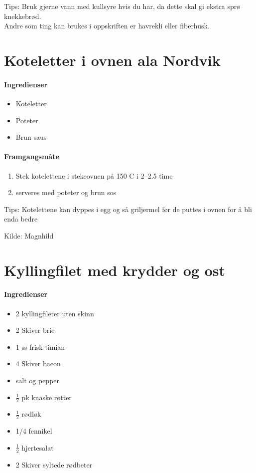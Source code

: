 \documentclass[12pt,a4paper]{book}
\begin{document}
Tips: Bruk gjerne vann med kullsyre hvis du har, da dette skal gi ekstra sprø knekkebrød. \\ Andre som ting kan brukes i oppskriften er havrekli eller fiberhusk.
\clearpage{}
\clearpage{}\section{﻿Koteletter i ovnen ala Nordvik}


\paragraph{Ingredienser}
\begin{itemize}[noitemsep]
	\item Koteletter
	\item Poteter
	\item Brun saus
\end{itemize}

\paragraph{Framgangsmåte}
\begin{enumerate}[noitemsep]
	\item Stek kotelettene i stekeovnen på 150 \degree C i 2--2.5 time
	\item serveres med poteter og brun sos
\end{enumerate}

Tips: Kotelettene kan dyppes i egg og så griljermel før de puttes i ovnen for å bli enda bedre

Kilde: Magnhild
\clearpage{}
\clearpage{}\section{﻿Kyllingfilet med krydder og ost}


\paragraph{Ingredienser}
\begin{itemize}[noitemsep]
	\item 2 kyllingfileter uten skinn
	\item 2 Skiver  brie
	\item 1 ss frisk timian
	\item 4 Skiver bacon
	\item salt og pepper
	\item $\frac{1}{2}$  pk knaske røtter
	\item $\frac{1}{2}$  rødløk
	\item 1/4 fennikel
	\item $\frac{1}{2}$  hjertesalat
	\item 2 Skiver syltede rødbeter
\end{itemize}
\end{document}
